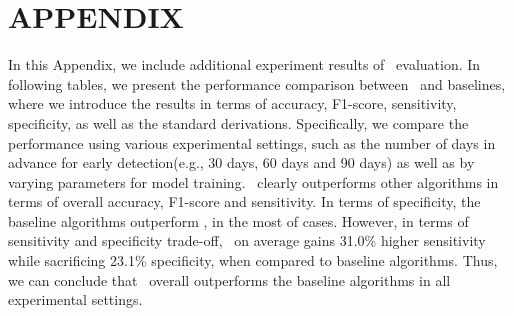 \appendix
\section*{APPENDIX}
\setcounter{section}{0}
\setcounter{table}{0}
In this Appendix, we include additional experiment results of \TheName\ evaluation. In following tables, we present the performance comparison between \TheName\ and baselines, where we introduce the results in terms of accuracy, F1-score, sensitivity, specificity, as well as the standard derivations. Specifically, we compare the performance using various experimental settings, such as the number of days in advance for early detection(e.g., 30 days, 60 days and 90 days) as well as by varying parameters for model training. \TheName\ clearly outperforms other algorithms in terms of overall accuracy, F1-score and sensitivity. In terms of specificity, the baseline algorithms outperform \TheName, in the most of cases. However, in terms of sensitivity and specificity trade-off, \TheName\ on average gains 31.0\% higher sensitivity while sacrificing 23.1\% specificity, when compared to baseline algorithms. Thus, we can conclude that \TheName\ overall outperforms the baseline algorithms in all experimental settings. 


